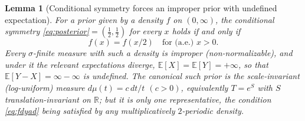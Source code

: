 \documentclass{amsart}
\theoremstyle{plain}
\newtheorem{lemma}{Lemma}
\theoremstyle{definition}
\begin{document}
\begin{lemma}[Conditional symmetry forces an improper prior with undefined
expectation]\label{lem:improper}
For a prior given by a density $f$ on $(0,\infty)$, the conditional symmetry
\eqref{eq:posterior}$=(\tfrac12,\tfrac12)$ for every $x$ holds if and only if
\begin{equation}\label{eq:fdyad}
f(x)=f(x/2)\quad\text{for (a.e.)\ }x>0 .
\end{equation}
\emph{Every} $\sigma$-finite measure with such a density is improper
(non-normalizable), and under it the relevant expectations diverge,
$\mathbb E[X]=\mathbb E[Y]=+\infty$, so that $\mathbb E[Y-X]=\infty-\infty$ is
undefined. The canonical such prior is the scale-invariant (log-uniform)
measure $d\mu(t)=c\,dt/t$ \((c>0)\), equivalently $T=e^{S}$ with $S$
translation-invariant on $\mathbb R$; but it is only one representative, the
condition \eqref{eq:fdyad} being satisfied by \emph{any} multiplicatively
$2$-periodic density.
\end{lemma}
\end{document}

